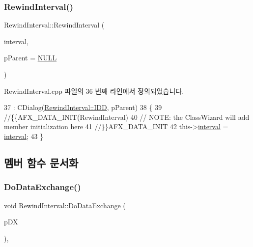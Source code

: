 \subsubsection{\texorpdfstring{Rewind\+Interval()}{RewindInterval()}}
{\footnotesize\ttfamily Rewind\+Interval\+::\+Rewind\+Interval (\begin{DoxyParamCaption}\item[{\mbox{\hyperlink{_util_8cpp_a0ef32aa8672df19503a49fab2d0c8071}{int}}}]{interval,  }\item[{C\+Wnd $\ast$}]{p\+Parent = {\ttfamily \mbox{\hyperlink{_system_8h_a070d2ce7b6bb7e5c05602aa8c308d0c4}{N\+U\+LL}}} }\end{DoxyParamCaption})}



Rewind\+Interval.\+cpp 파일의 36 번째 라인에서 정의되었습니다.


\begin{DoxyCode}
37   : CDialog(\mbox{\hyperlink{class_rewind_interval_aea74dcd9cfdb01eab907a1e6a633786fa422d7fb0e0b5b81c5e1681c417ea1963}{RewindInterval::IDD}}, pParent)
38 \{
39   \textcolor{comment}{//\{\{AFX\_DATA\_INIT(RewindInterval)}
40   \textcolor{comment}{// NOTE: the ClassWizard will add member initialization here}
41   \textcolor{comment}{//\}\}AFX\_DATA\_INIT}
42   this->\mbox{\hyperlink{class_rewind_interval_a3bf155d8d02f9b48cfb2c521fbd05c10}{interval}} = \mbox{\hyperlink{class_rewind_interval_a3bf155d8d02f9b48cfb2c521fbd05c10}{interval}};
43 \}
\end{DoxyCode}


\subsection{멤버 함수 문서화}
\mbox{\label{class_rewind_interval_a5edc01838b4b72a8aef111e9c1103d1b}} 
\subsubsection{\texorpdfstring{Do\+Data\+Exchange()}{DoDataExchange()}}
{\footnotesize\ttfamily void Rewind\+Interval\+::\+Do\+Data\+Exchange (\begin{DoxyParamCaption}\item[{C\+Data\+Exchange $\ast$}]{p\+DX }\end{DoxyParamCaption})\hspace{0.3cm}{\ttfamily [protected]}, {\ttfamily [virtual]}}



